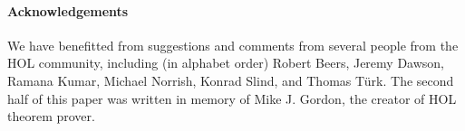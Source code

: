 

\paragraph{Acknowledgements}

We have benefitted from suggestions and comments 
from several people from the HOL
community, including (in alphabet order) Robert Beers, Jeremy Dawson,
Ramana Kumar,
Michael Norrish, 
Konrad Slind, and
Thomas T\"{u}rk.
%
The second half of this
paper was written in memory of Mike J. Gordon, the creator of HOL theorem prover.
